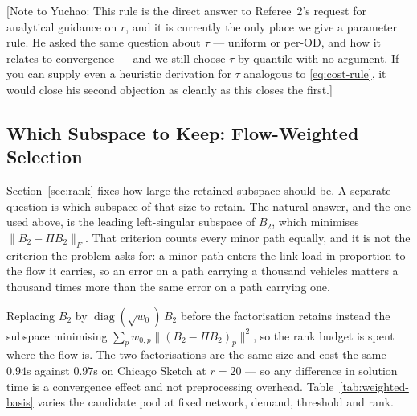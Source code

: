 \documentclass[11pt]{article}
\newcommand{\conoteY}[1]{{\color{red}\small\textsf{[Note to Yuchao: #1]}}}
\begin{document}
\conoteY{This rule is the direct answer to Referee~2's request for analytical guidance on
$r$, and it is currently the only place we give a parameter rule. He asked the same question
about $\tau$ --- uniform or per-OD, and how it relates to convergence --- and we still choose
$\tau$ by quantile with no argument. If you can supply even a heuristic derivation for $\tau$
analogous to \eqref{eq:cost-rule}, it would close his second objection as cleanly as this
closes the first.}


\subsection{Which Subspace to Keep: Flow-Weighted Selection}
\label{sec:weighted-basis}

Section~\ref{sec:rank} fixes how large the retained subspace should be. A separate question is
which subspace of that size to retain. The natural answer, and the one used above, is the
leading left-singular subspace of $B_2$, which minimises $\|B_2 - \Pi B_2\|_F$. That criterion
counts every minor path equally, and it is not the criterion the problem asks for: a minor path
enters the link load in proportion to the flow it carries, so an error on a path carrying a
thousand vehicles matters a thousand times more than the same error on a path carrying one.

Replacing $B_2$ by $\operatorname{diag}(\sqrt{w_0})\,B_2$ before the factorisation retains
instead the subspace minimising $\sum_p w_{0,p}\|(B_2-\Pi B_2)_p\|^2$, so the rank budget is
spent where the flow is. The two factorisations are the same size and cost the same --- $0.94$s
against $0.97$s on Chicago Sketch at $r=20$ --- so any difference in solution time is a
convergence effect and not preprocessing overhead. Table~\ref{tab:weighted-basis} varies the
candidate pool at fixed network, demand, threshold and rank.
\end{document}
